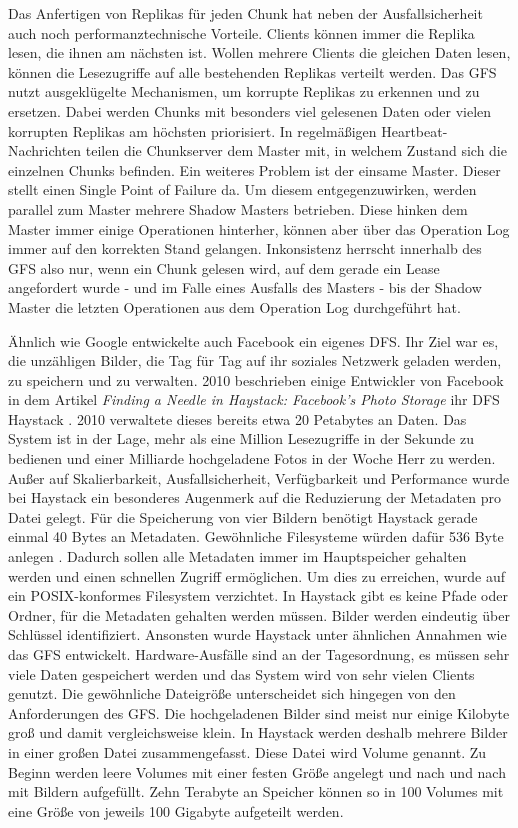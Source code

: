 \documentclass[12pt,oneside,a4paper,parskip]{scrbook}
\begin{document}
Das Anfertigen von Replikas für jeden Chunk hat neben der Ausfallsicherheit auch noch performanztechnische Vorteile. Clients können immer die Replika lesen, die ihnen am nächsten ist. Wollen mehrere Clients die gleichen Daten lesen, können die Lesezugriffe auf alle bestehenden Replikas verteilt werden. Das GFS nutzt ausgeklügelte Mechanismen, um korrupte Replikas zu erkennen und zu ersetzen. Dabei werden Chunks mit besonders viel gelesenen Daten oder vielen korrupten Replikas am höchsten priorisiert. In regelmäßigen Heartbeat-Nachrichten teilen die Chunkserver dem Master mit, in welchem Zustand sich die einzelnen Chunks befinden. Ein weiteres Problem ist der einsame Master. Dieser stellt einen Single Point of Failure da. Um diesem entgegenzuwirken, werden parallel zum Master mehrere Shadow Masters betrieben. Diese hinken dem Master immer einige Operationen hinterher, können aber über das Operation Log immer auf den korrekten Stand gelangen. Inkonsistenz herrscht innerhalb des GFS also nur, wenn ein Chunk gelesen wird, auf dem gerade ein Lease angefordert wurde - und im Falle eines Ausfalls des Masters - bis der Shadow Master die letzten Operationen aus dem Operation Log durchgeführt hat.

Ähnlich wie Google entwickelte auch Facebook ein eigenes DFS. Ihr Ziel war es, die unzähligen Bilder, die Tag für Tag auf ihr soziales Netzwerk geladen werden, zu speichern und zu verwalten. 2010 beschrieben einige Entwickler von Facebook in dem Artikel \textit{Finding a Needle in Haystack: Facebook's Photo Storage} ihr DFS Haystack \cite{haystack}. 2010 verwaltete dieses bereits etwa 20 Petabytes an Daten. Das System ist in der Lage, mehr als eine Million Lesezugriffe in der Sekunde zu bedienen und einer Milliarde hochgeladene Fotos in der Woche Herr zu werden. Außer auf Skalierbarkeit, Ausfallsicherheit, Verfügbarkeit und Performance wurde bei Haystack ein besonderes Augenmerk auf die Reduzierung der Metadaten pro Datei gelegt. Für die Speicherung von vier Bildern benötigt Haystack gerade einmal 40 Bytes an Metadaten. Gewöhnliche Filesysteme würden dafür 536 Byte anlegen \cite{haystack}. Dadurch sollen alle Metadaten immer im Hauptspeicher gehalten werden und einen schnellen Zugriff ermöglichen. Um dies zu erreichen, wurde auf ein POSIX-konformes Filesystem verzichtet. In Haystack gibt es keine Pfade oder Ordner, für die Metadaten gehalten werden müssen. Bilder werden eindeutig über Schlüssel identifiziert. Ansonsten wurde Haystack unter ähnlichen Annahmen wie das GFS entwickelt. Hardware-Ausfälle sind an der Tagesordnung, es müssen sehr viele Daten gespeichert werden und das System wird von sehr vielen Clients genutzt. Die gewöhnliche Dateigröße unterscheidet sich hingegen von den Anforderungen des GFS. Die hochgeladenen Bilder sind meist nur einige Kilobyte groß und damit vergleichsweise klein. In Haystack werden deshalb mehrere Bilder in einer großen Datei zusammengefasst. Diese Datei wird Volume genannt. Zu Beginn werden leere Volumes mit einer festen Größe angelegt und nach und nach mit Bildern aufgefüllt. Zehn Terabyte an Speicher können so in 100 Volumes mit eine Größe von jeweils 100 Gigabyte aufgeteilt werden.
\end{document}
